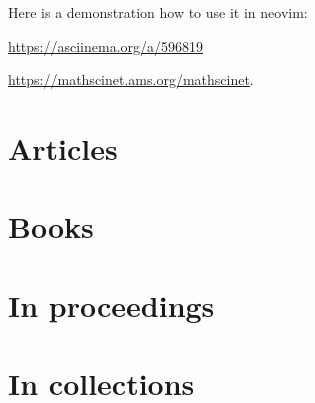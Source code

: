 \documentclass[a4paper,11pt]{article}
\begin{document}
Here is a demonstration how to use it in neovim:
\begin{center}
  \url{https://asciinema.org/a/596819}
\end{center}

\begin{center}
  \url{https://mathscinet.ams.org/mathscinet}.
\end{center}




\tableofcontents

\citeall

\section{Articles}%
\label{sec:Articles}

\printbibliography[type=article,title={Articles}]
\section{Books}%
\label{sec:Books}

\printbibliography[type=book,title={Books}]

\section{In proceedings}%
\label{sec:In proceedings}

\printbibliography[type=inproceedings,title={In proceedings}]

\section{In collections}%
\label{sec:In collections}

\printbibliography[type=incollection,title={In collection}]

\end{document}
